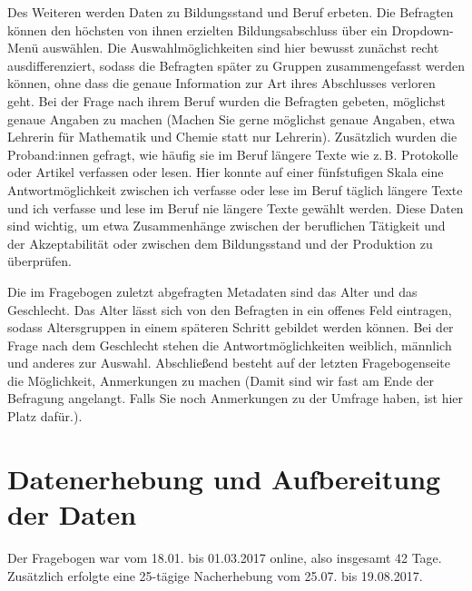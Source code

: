 Des Weiteren werden Daten zu Bildungsstand und Beruf erbeten. 
Die Befragten können den höchsten von ihnen erzielten Bildungsabschluss über ein Dropdown\hyp Menü auswählen. 
Die Auswahlmöglichkeiten sind hier bewusst zunächst recht ausdifferenziert, sodass die Befragten später zu Gruppen zusammengefasst werden können, ohne dass die genaue Information zur Art ihres Abschlusses verloren geht. 
Bei der Frage nach ihrem Beruf wurden die Befragten gebeten, möglichst genaue Angaben zu machen (\glqq Machen Sie gerne möglichst genaue Angaben, etwa \glq Lehrerin für Mathematik und Chemie\grq{} statt nur \glq Lehrerin\grq [...]\grqq). 
Zusätzlich wurden die Proband:innen gefragt, wie häufig sie im Beruf längere Texte wie z.\,B. Protokolle oder Artikel verfassen oder lesen. 
Hier konnte auf einer fünfstufigen Skala eine Antwortmöglichkeit zwischen \glqq ich verfasse oder lese im Beruf täglich längere Texte\grqq{} und \glqq ich verfasse und lese im Beruf nie längere Texte\grqq{} gewählt werden. 
Diese Daten sind wichtig, um etwa Zusammenhänge zwischen der beruflichen Tätigkeit und der Akzeptabilität oder zwischen dem Bildungsstand und der Produktion zu überprüfen. 

Die im Fragebogen zuletzt abgefragten Metadaten sind das Alter und das Geschlecht. Das Alter lässt sich von den Befragten in ein offenes Feld eintragen, sodass Altersgruppen in einem späteren Schritt gebildet werden können. Bei der Frage nach dem Geschlecht stehen die Antwortmöglichkeiten \glqq weiblich\grqq, \glqq männlich\grqq{} und \glqq anderes\grqq{} zur Auswahl. Abschließend besteht auf der letzten Fragebogenseite die Möglichkeit, Anmerkungen zu machen (\glqq Damit sind wir fast am Ende der Befragung angelangt. Falls Sie noch Anmerkungen zu der Umfrage haben, ist hier Platz dafür.\grqq). 

\section{Datenerhebung und Aufbereitung der Daten}
\label{sec:DatenerhebungundAufbereitung}
Der Fragebogen war vom 18.01. bis 01.03.2017 online, also insgesamt 42 Tage. Zusätzlich erfolgte eine 25-tägige Nacherhebung vom 25.07. bis 19.08.2017. 

